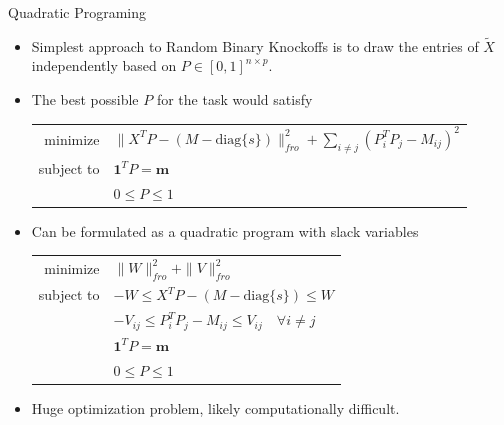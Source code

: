 \documentclass{beamer}
\newcommand{\diag}[1]{\mathrm{diag}\{#1\}}
\begin{document}
\begin{frame}{Quadratic Programing}
    \begin{itemize} 
        \item Simplest approach to Random Binary Knockoffs is to draw the entries of $\tilde X$ independently based on $P\in[0,1]^{n\times p}$.
        \item The best possible $P$ for the task would satisfy
            \begin{center}
                \begin{tabular}{r l}
                    minimize     & $\|X^TP-(M-\diag{s})\|_{fro}^2 + \sum_{i\neq j}(P_i^T P_j - M_{ij})^2 $\\
                    subject to   & $ \mathbf 1^T P = \mathbf m $ \\
                                 & $0 \leq P \leq 1$
                \end{tabular} 
            \end{center}
        \item Can be formulated as a quadratic program with slack variables
            \begin{center}
                \begin{tabular}{r l}
                    minimize     & $\|W\|_{fro}^2 + \|V\|_{fro}^2 $ \\
                    subject to   & $ -W \leq X^TP-(M-\diag{s})\leq W $ \\
                                 & $ -V_{ij} \leq P_i^T P_j - M_{ij} \leq V_{ij} \quad \forall i\neq j$ \\
                                 & $ \mathbf 1^T P = \mathbf m $ \\
                                 & $0 \leq P \leq 1$
                \end{tabular} 
            \end{center}
        \item Huge optimization problem, likely computationally difficult.
    \end{itemize}
\end{frame}
\end{document}
